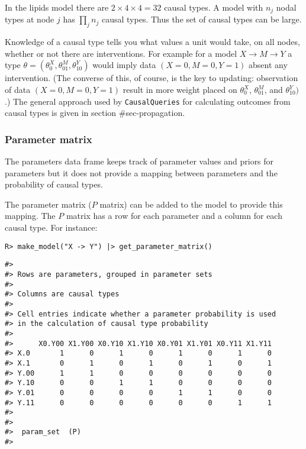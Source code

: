 \documentclass[
  11pt,
  article]{jss}
\begin{document}
In the lipids model there are \(2\times 4\times 4 = 32\) causal types. A
model with \(n_j\) nodal types at node \(j\) has \(\prod_jn_j\) causal
types. Thus the set of causal types can be large.

Knowledge of a causal type tells you what values a unit would take, on
all nodes, whether or not there are interventions. For example for a
model \(X \rightarrow M \rightarrow Y\) a type
\(\theta = (\theta^X_0, \theta^M_{01}, \theta^Y_{10})\) would imply data
\((X=0, M=0, Y=1)\) absent any intervention. (The converse of this, of
course, is the key to updating: observation of data \((X=0, M=0, Y=1)\)
result in more weight placed on \(\theta^X_0\), \(\theta^M_{01}\), and
\(\theta^Y_{10})\).) The general approach used by \texttt{CausalQueries}
for calculating outcomes from causal types is given in section
\#sec-propagation.

\hypertarget{parameter-matrix}{%
\subsubsection{Parameter matrix}\label{parameter-matrix}}

The parameters data frame keeps track of parameter values and priors for
parameters but it does not provide a mapping between parameters and the
probability of causal types.

The parameter matrix (\(P\) matrix) can be added to the model to provide
this mapping. The \(P\) matrix has a row for each parameter and a column
for each causal type. For instance:

\begin{verbatim}
R> make_model("X -> Y") |> get_parameter_matrix()
\end{verbatim}

\begin{verbatim}
#> 
#> Rows are parameters, grouped in parameter sets
#> 
#> Columns are causal types
#> 
#> Cell entries indicate whether a parameter probability is used
#> in the calculation of causal type probability
#> 
#>      X0.Y00 X1.Y00 X0.Y10 X1.Y10 X0.Y01 X1.Y01 X0.Y11 X1.Y11
#> X.0       1      0      1      0      1      0      1      0
#> X.1       0      1      0      1      0      1      0      1
#> Y.00      1      1      0      0      0      0      0      0
#> Y.10      0      0      1      1      0      0      0      0
#> Y.01      0      0      0      0      1      1      0      0
#> Y.11      0      0      0      0      0      0      1      1
#> 
#>  
#>  param_set  (P)
#> 
\end{verbatim}
\end{document}
